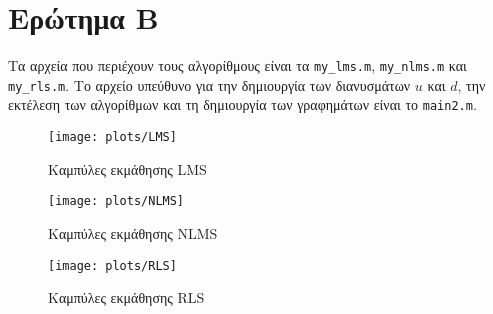\section{Ερώτημα Β}\label{section:B}
Τα αρχεία που περιέχουν τους αλγορίθμους είναι τα
\texttt{my_lms.m}, \texttt{my_nlms.m} και \texttt{my_rls.m}.
Το αρχείο υπεύθυνο για την δημιουργία των διανυσμάτων $u$ και $d$, την εκτέλεση των αλγορίθμων και τη δημιουργία των γραφημάτων είναι το \texttt{main2.m}.

\begin{figure}
\texttt{[image: plots/LMS]}
\caption{Καμπύλες εκμάθησης LMS}
\label{fig:lms}
\end{figure}
\begin{figure}
\texttt{[image: plots/NLMS]}
\caption{Καμπύλες εκμάθησης NLMS}
\label{fig:nmls}
\end{figure}
\begin{figure}
\texttt{[image: plots/RLS]}
\caption{Καμπύλες εκμάθησης RLS}
\label{fig:rls}
\end{figure}
\FloatBarrier
